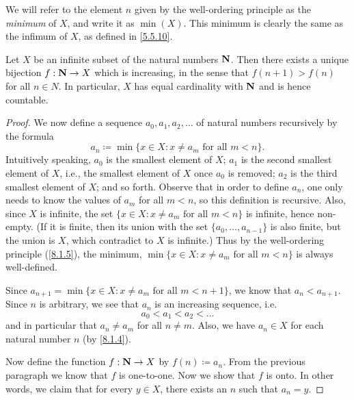 \begin{note}
  We will refer to the element \(n\) given by the well-ordering principle as the \emph{minimum} of \(X\), and write it as \(\min(X)\).
  This minimum is clearly the same as the infimum of \(X\), as defined in \cref{5.5.10}.
\end{note}

\begin{proposition}\label{8.1.5}
  Let \(X\) be an infinite subset of the natural numbers \(\mathbf{N}\).
  Then there exists a unique bijection \(f : \mathbf{N} \to X\) which is increasing, in the sense that \(f(n + 1) > f(n)\) for all \(n \in N\).
  In particular, \(X\) has equal cardinality with \(\mathbf{N}\) and is hence countable.
\end{proposition}

\begin{proof}
  We now define a sequence \(a_0, a_1, a_2, \dots\) of natural numbers recursively by the formula
  \[
    a_n \coloneqq \min\{x \in X : x \neq a_m \text{ for all } m < n\}.
  \]
  Intuitively speaking, \(a_0\) is the smallest element of \(X\);
  \(a_1\) is the second smallest element of \(X\), i.e., the smallest element of \(X\) once \(a_0\) is removed;
  \(a_2\) is the third smallest element of \(X\);
  and so forth.
  Observe that in order to define \(a_n\), one only needs to know the values of \(a_m\) for all \(m < n\), so this definition is recursive.
  Also, since \(X\) is infinite, the set \(\{x \in X : x \neq a_m \text{ for all } m < n\}\) is infinite, hence non-empty.
  (If it is finite, then its union with the set \(\{a_0, \dots, a_{n - 1}\}\) is also finite, but the union is \(X\), which contradict to \(X\) is infinite.)
  Thus by the well-ordering principle (\cref{8.1.5}), the minimum, \(\min\{x \in X : x \neq a_m \text{ for all } m < n\}\) is always well-defined.

  Since \(a_{n + 1} = \min\{x \in X : x \neq a_m \text{ for all } m < n + 1\}\), we know that \(a_n < a_{n + 1}\).
  Since \(n\) is arbitrary, we see that \(a_n\) is an increasing sequence, i.e.
  \[
    a_0 < a_1 < a_2 < \dots
  \]
  and in particular that \(a_n \neq a_m\) for all \(n \neq m\).
  Also, we have \(a_n \in X\) for each natural number \(n\) (by \cref{8.1.4}).

  Now define the function \(f : \mathbf{N} \to X\) by \(f(n) \coloneqq a_n\).
  From the previous paragraph we know that \(f\) is one-to-one.
  Now we show that \(f\) is onto.
  In other words, we claim that for every \(y \in X\), there exists an \(n\) such that \(a_n = y\).


\end{proof}
